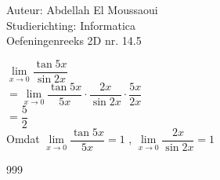 \documentclass[a4paper]{article}
\begin{document}
  
\noindent \large Auteur: Abdellah El Moussaoui \\
\noindent \large Studierichting: Informatica\\
\noindent \large Oefeningenreeks 2D nr. 14.5\\

\medskip

\normalsize


$\lim\limits_{x\to0} \dfrac{\tan{5x}}{\sin{2x}}$\\


$ = \lim\limits_{x\to0} \dfrac{\tan{5x}}{5x} \cdot \dfrac{2x}{\sin{2x}} \cdot \dfrac{5x}{2x}$\\

$ = \dfrac{5}{2}$\\

Omdat $\lim\limits_{x\to0} \dfrac{\tan{5x}}{5x}=1$ , $\lim\limits_{x\to0} \dfrac{2x}{\sin{2x}}=1$\\

\begin{thebibliography}{999}
\end{thebibliography}
\end{document}

